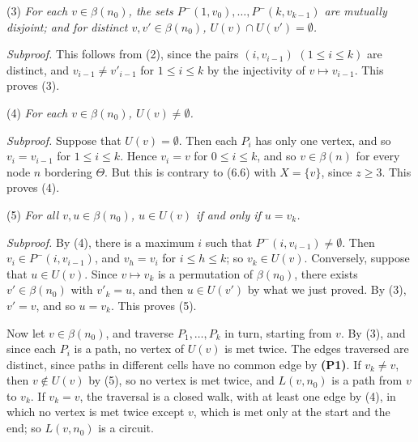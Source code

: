 {\hspace*{12pt}(3) \textit{For each $v \in \beta(n_0)$, the sets $P^-(1, v_0), \dots, P^-(k, v_{k-1})$ are mutually disjoint; and for distinct $v, v' \in \beta(n_0)$, $U(v) \cap U(v') = \emptyset$.}

\textit{Subproof.} This follows from (2), since the pairs $(i, v_{i-1})$ $(1 \le i \le k)$ are distinct, and $v_{i-1} \ne v'_{i-1}$ for $1 \le i \le k$ by the injectivity of $v \mapsto v_{i-1}$. This proves (3).

\hspace*{12pt}(4) \textit{For each $v \in \beta(n_0)$, $U(v) \ne \emptyset$.}

\textit{Subproof.} Suppose that $U(v) = \emptyset$. Then each $P_i$ has only one vertex, and so $v_i = v_{i-1}$ for $1 \le i \le k$. Hence $v_i = v$ for $0 \le i \le k$, and so $v \in \beta(n)$ for every node $n$ bordering $\Theta$. But this is contrary to (6.6) with $X = \{v\}$, since $z \ge 3$. This proves (4).

\hspace*{12pt}(5) \textit{For all $v, u \in \beta(n_0)$, $u \in U(v)$ if and only if $u = v_k$.}

\textit{Subproof.} By (4), there is a maximum $i$ such that $P^-(i, v_{i-1}) \ne \emptyset$. Then $v_i \in P^-(i, v_{i-1})$, and $v_h = v_i$ for $i \le h \le k$; so $v_k \in U(v)$. Conversely, suppose that $u \in U(v)$. Since $v \mapsto v_k$ is a permutation of $\beta(n_0)$, there exists $v' \in \beta(n_0)$ with $v'_k = u$, and then $u \in U(v')$ by what we just proved. By (3), $v' = v$, and so $u = v_k$. This proves (5).

Now let $v \in \beta(n_0)$, and traverse $P_1, \dots, P_k$ in turn, starting from $v$. By (3), and since each $P_i$ is a path, no vertex of $U(v)$ is met twice. The edges traversed are distinct, since paths in different cells have no common edge by \textbf{(P1)}. If $v_k \ne v$, then $v \notin U(v)$ by (5), so no vertex is met twice, and $L(v, n_0)$ is a path from $v$ to $v_k$. If $v_k = v$, the traversal is a closed walk, with at least one edge by (4), in which no vertex is met twice except $v$, which is met only at the start and the end; so $L(v, n_0)$ is a circuit.

}
